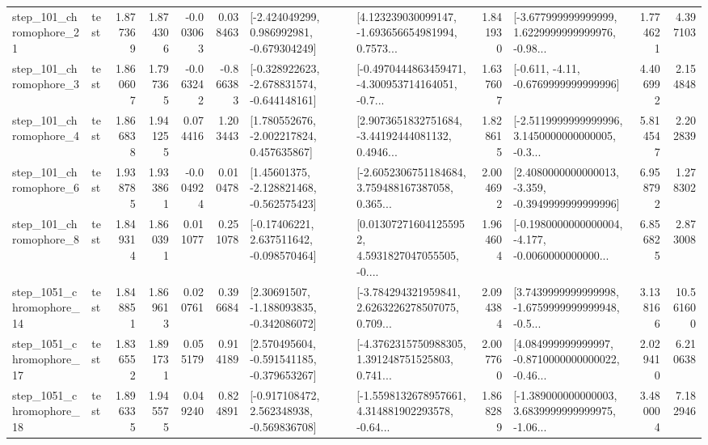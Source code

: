 \begin{tabular}{llrrrrllrlrr}
  step\_101\_chromophore\_21 &      test &      1.877369 &    1.874306 &     -0.003063 &  0.038463 &   [-2.424049299, 0.986992981, -0.679304249] &  [4.123239030099147, -1.693656654981994, 0.7573... &       1.841930 &  [-3.677999999999999, 1.6229999999999976, -0.98... &            1.774621 &          4.397103 \\
   step\_101\_chromophore\_3 &      test &      1.860607 &    1.797365 &     -0.063242 & -0.866383 &  [-0.328922623, -2.678831574, -0.644148161] &  [-0.4970444863459471, -4.300953714164051, -0.7... &       1.637607 &               [-0.611, -4.11, -0.6769999999999996] &            4.406992 &          2.154848 \\
   step\_101\_chromophore\_4 &      test &      1.866838 &    1.941255 &      0.074416 &  1.203443 &    [1.780552676, -2.002217824, 0.457635867] &  [2.9073651832751684, -3.44192444081132, 0.4946... &       1.828615 &  [-2.5119999999999996, 3.1450000000000005, -0.3... &            5.814547 &          2.202839 \\
   step\_101\_chromophore\_6 &      test &      1.938785 &    1.933861 &     -0.004924 &  0.010478 &    [1.45601375, -2.128821468, -0.562575423] &  [-2.6052306751184684, 3.759488167387058, 0.365... &       2.004692 &  [2.4080000000000013, -3.359, -0.3949999999999996] &            6.958792 &          1.278302 \\
   step\_101\_chromophore\_8 &      test &      1.849314 &    1.860391 &      0.011077 &  0.251078 &    [-0.17406221, 2.637511642, -0.098570464] &  [0.013072716041255952, 4.5931827047055505, -0.... &       1.964604 &  [-0.1980000000000004, -4.177, -0.0060000000000... &            6.856825 &          2.873008 \\
 step\_1051\_chromophore\_14 &      test &      1.848851 &    1.869613 &      0.020761 &  0.396684 &    [2.30691507, -1.188093835, -0.342086072] &  [-3.784294321959841, 2.6263226278507075, 0.709... &       2.094384 &  [3.7439999999999998, -1.6759999999999948, -0.5... &            3.138166 &         10.561600 \\
 step\_1051\_chromophore\_17 &      test &      1.836552 &    1.891731 &      0.055179 &  0.914189 &   [2.570495604, -0.591541185, -0.379653267] &  [-4.3762315750988305, 1.391248751525803, 0.741... &       2.007760 &  [4.084999999999997, -0.8710000000000022, -0.46... &            2.029410 &          6.210638 \\
 step\_1051\_chromophore\_18 &      test &      1.896335 &    1.945575 &      0.049240 &  0.824891 &   [-0.917108472, 2.562348938, -0.569836708] &  [-1.5598132678957661, 4.314881902293578, -0.64... &       1.868289 &  [-1.389000000000003, 3.6839999999999975, -1.06... &            3.480004 &          7.182946 \\

\end{tabular}
